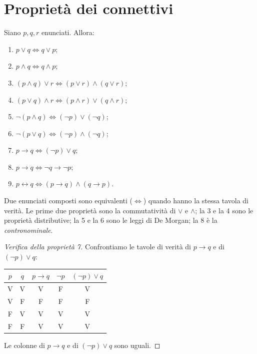 \documentclass[11pt,a4paper]{article}
\theoremstyle{definition}
\newcommand{\V}{\textsf{V}}
\newcommand{\F}{\textsf{F}}
\begin{document}
\section{Proprietà dei connettivi}

\begin{proposizione}
Siano $p, q, r$ enunciati. Allora:
\begin{enumerate}
    \item $p \lor q \iff q \lor p$;
    \item $p \land q \iff q \land p$;
    \item $(p \land q) \lor r \iff (p \lor r) \land (q \lor r)$;
    \item $(p \lor q) \land r \iff (p \land r) \lor (q \land r)$;
    \item $\neg(p \land q) \iff (\neg p) \lor (\neg q)$;
    \item $\neg(p \lor q) \iff (\neg p) \land (\neg q)$;
    \item $p \to q \iff (\neg p) \lor q$;
    \item $p \to q \iff \neg q \to \neg p$;
    \item $p \leftrightarrow q \iff (p \to q) \land (q \to p)$.
\end{enumerate}
\end{proposizione}

Due enunciati composti sono equivalenti ($\iff$) quando hanno la stessa
tavola di verità. Le prime due proprietà sono la commutatività di $\lor$ e
$\land$; la 3 e la 4 sono le proprietà distributive; la 5 e la 6 sono le
leggi di De Morgan; la 8 è la \emph{contronominale}.

\begin{proof}[Verifica della proprietà 7]
Confrontiamo le tavole di verità di $p \to q$ e di $(\neg p) \lor q$:
\begin{center}
\begin{tabular}{cc|c|c|c}
$p$ & $q$ & $p \to q$ & $\neg p$ & $(\neg p) \lor q$ \\ \hline
\V & \V & \V & \F & \V \\
\V & \F & \F & \F & \F \\
\F & \V & \V & \V & \V \\
\F & \F & \V & \V & \V
\end{tabular}
\end{center}
Le colonne di $p \to q$ e di $(\neg p) \lor q$ sono uguali.
\end{proof}
\end{document}
